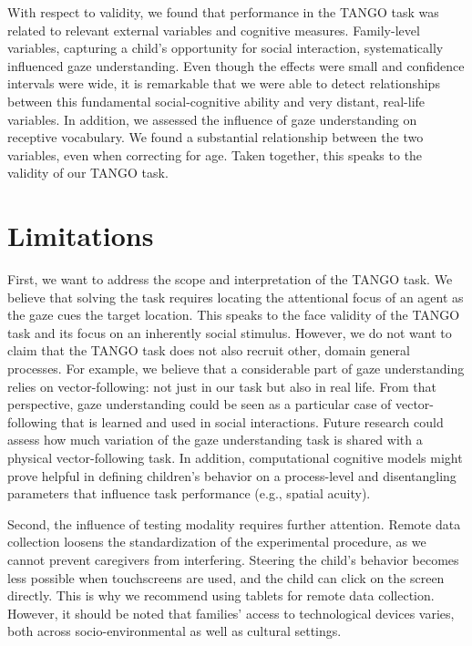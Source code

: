 \documentclass[
  man,floatsintext]{apa7}
\begin{document}
With respect to validity, we found that performance in the TANGO task was related to relevant external variables and cognitive measures.
Family-level variables, capturing a child's opportunity for social interaction, systematically influenced gaze understanding. Even though the effects were small and confidence intervals were wide, it is remarkable that we were able to detect relationships between this fundamental social-cognitive ability and very distant, real-life variables.
In addition, we assessed the influence of gaze understanding on receptive vocabulary.
We found a substantial relationship between the two variables, even when correcting for age.
Taken together, this speaks to the validity of our TANGO task.

\hypertarget{limitations}{%
\section{Limitations}\label{limitations}}

First, we want to address the scope and interpretation of the TANGO task.
We believe that solving the task requires locating the attentional focus of an agent as the gaze cues the target location.
This speaks to the face validity of the TANGO task and its focus on an inherently social stimulus.
However, we do not want to claim that the TANGO task does not also recruit other, domain general processes.
For example, we believe that a considerable part of gaze understanding relies on vector-following: not just in our task but also in real life.
From that perspective, gaze understanding could be seen as a particular case of vector-following that is learned and used in social interactions.
Future research could assess how much variation of the gaze understanding task is shared with a physical vector-following task.
In addition, computational cognitive models might prove helpful in defining children's behavior on a process-level and disentangling parameters that influence task performance (e.g., spatial acuity).

Second, the influence of testing modality requires further attention.
Remote data collection loosens the standardization of the experimental procedure, as we cannot prevent caregivers from interfering.
Steering the child's behavior becomes less possible when touchscreens are used, and the child can click on the screen directly.
This is why we recommend using tablets for remote data collection.
However, it should be noted that families' access to technological devices varies, both across socio-environmental as well as cultural settings.
\end{document}

